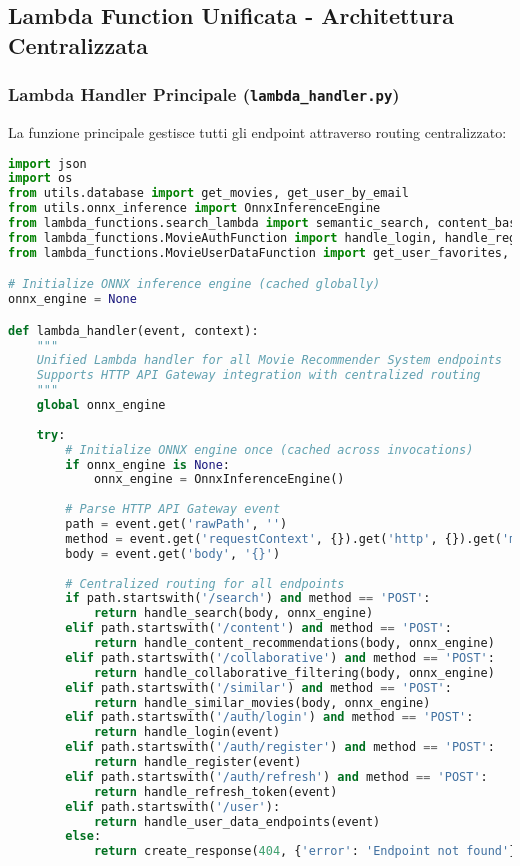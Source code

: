 \documentclass[11pt,a4paper]{article}
\begin{document}
\subsection{Lambda Function Unificata - Architettura Centralizzata}

\subsubsection{Lambda Handler Principale (\texttt{lambda\_handler.py})}
La funzione principale gestisce tutti gli endpoint attraverso routing centralizzato:

\begin{lstlisting}[language=Python, caption=Lambda Handler - Router Centralizzato]
import json
import os
from utils.database import get_movies, get_user_by_email
from utils.onnx_inference import OnnxInferenceEngine
from lambda_functions.search_lambda import semantic_search, content_based_recommendations
from lambda_functions.MovieAuthFunction import handle_login, handle_register
from lambda_functions.MovieUserDataFunction import get_user_favorites, add_to_favorites

# Initialize ONNX inference engine (cached globally)
onnx_engine = None

def lambda_handler(event, context):
    """
    Unified Lambda handler for all Movie Recommender System endpoints
    Supports HTTP API Gateway integration with centralized routing
    """
    global onnx_engine
    
    try:
        # Initialize ONNX engine once (cached across invocations)
        if onnx_engine is None:
            onnx_engine = OnnxInferenceEngine()
        
        # Parse HTTP API Gateway event
        path = event.get('rawPath', '')
        method = event.get('requestContext', {}).get('http', {}).get('method', '')
        body = event.get('body', '{}')
        
        # Centralized routing for all endpoints
        if path.startswith('/search') and method == 'POST':
            return handle_search(body, onnx_engine)
        elif path.startswith('/content') and method == 'POST':
            return handle_content_recommendations(body, onnx_engine)
        elif path.startswith('/collaborative') and method == 'POST':
            return handle_collaborative_filtering(body, onnx_engine)
        elif path.startswith('/similar') and method == 'POST':
            return handle_similar_movies(body, onnx_engine)
        elif path.startswith('/auth/login') and method == 'POST':
            return handle_login(event)
        elif path.startswith('/auth/register') and method == 'POST':
            return handle_register(event)
        elif path.startswith('/auth/refresh') and method == 'POST':
            return handle_refresh_token(event)
        elif path.startswith('/user'):
            return handle_user_data_endpoints(event)
        else:
            return create_response(404, {'error': 'Endpoint not found'})
            

\end{lstlisting}
\end{document}
